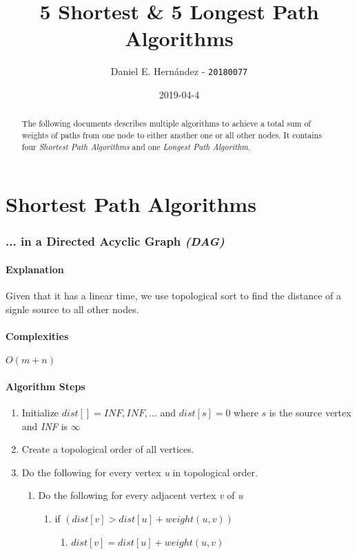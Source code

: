 \documentclass[]{article}
\title{\textbf{5 Shortest \& 5 Longest Path Algorithms}}
\author{Daniel E. Hernández - \texttt{20180077}}
\date{2019-04-4}
\begin{document}
\maketitle

\begin{abstract}
The following documents describes multiple algorithms to achieve a total sum of weights of paths from one node to either another one or all other nodes. It contains four \textit{Shortest Path Algorithms} and one \textit{Longest Path Algorithm}.
\end{abstract}

\part{Shortest Path Algorithms}
\section{... in a Directed Acyclic Graph \textit{(DAG)}}
\subsection{Explanation}
\par Given that it has a linear time, we use topological sort to find the distance of a signle source to all other nodes\cite{ShortestPathDirected2013}.

\subsection{Complexities}
\par $O(m + n)$

\subsection{Algorithm Steps}
\begin{enumerate}
	\item Initialize $dist[] = {INF, INF,...}$ and $dist[s] = 0$ where $s$ is the source vertex and \textit{INF} is $\infty$
	\item Create a topological order of all vertices.
	\item Do the following for every vertex \textit{u} in topological order.
	\begin{enumerate}
		\item Do the following for every adjacent vertex \textit{v} of \textit{u}
		\begin{enumerate}
			\item if $(dist[v] > dist[u] + weight(u,v))$
			\begin{enumerate}
				\item $dist[v] = dist[u] + weight(u,v)$
			\end{enumerate}
		\end{enumerate}
	\end{enumerate}
\end{enumerate}
\end{document}
